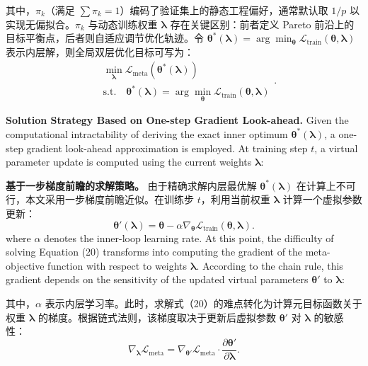\documentclass[11pt]{article}
\begin{document}
其中，$\pi_k$（满足 $\sum \pi_k = 1$）编码了验证集上的静态工程偏好，通常默认取 $1/p$ 以实现无偏拟合。$\pi_k$ 与动态训练权重 $\boldsymbol{\lambda}$ 存在关键区别：前者定义 Pareto 前沿上的目标平衡点，后者则自适应调节优化轨迹。令 $\boldsymbol{\theta}^*(\boldsymbol{\lambda}) = \arg \min_{\boldsymbol{\theta}} \mathcal{L}_{\text{train}}(\boldsymbol{\theta}, \boldsymbol{\lambda})$ 表示内层解，则全局双层优化目标可写为：
\begin{equation}
	\begin{aligned}
		& \min_{\boldsymbol{\lambda}} \mathcal{L}_{\text{meta}}(\boldsymbol{\theta}^*(\boldsymbol{\lambda})) \\
		& \text{s.t.} \quad \boldsymbol{\theta}^*(\boldsymbol{\lambda}) = \arg \min_{\boldsymbol{\theta}} \mathcal{L}_{\text{train}}(\boldsymbol{\theta}, \boldsymbol{\lambda})
	\end{aligned}.
\end{equation}

\textbf{Solution Strategy Based on One-step Gradient Look-ahead.} Given the computational intractability of deriving the exact inner optimum $\boldsymbol{\theta}^*(\boldsymbol{\lambda})$, a one-step gradient look-ahead approximation is employed. At training step $t$, a virtual parameter update is computed using the current weights $\boldsymbol{\lambda}$:

\textbf{基于一步梯度前瞻的求解策略。} 由于精确求解内层最优解 $\boldsymbol{\theta}^*(\boldsymbol{\lambda})$ 在计算上不可行，本文采用一步梯度前瞻近似。在训练步 $t$，利用当前权重 $\boldsymbol{\lambda}$ 计算一个虚拟参数更新：
\begin{equation}
	\boldsymbol{{\theta }'}(\boldsymbol{\lambda })=\boldsymbol{\theta }-\alpha {{\nabla }_{\boldsymbol{\theta }}}{{\mathcal{L}}_{\text{train}}}(\boldsymbol{\theta },\boldsymbol{\lambda }).
\end{equation}
where $\alpha$ denotes the inner-loop learning rate. At this point, the difficulty of solving Equation (20) transforms into computing the gradient of the meta-objective function with respect to weights $\boldsymbol{\lambda}$. According to the chain rule, this gradient depends on the sensitivity of the updated virtual parameters $\boldsymbol{\theta}'$ to $\boldsymbol{\lambda}$:

其中，$\alpha$ 表示内层学习率。此时，求解式（20）的难点转化为计算元目标函数关于权重 $\boldsymbol{\lambda}$ 的梯度。根据链式法则，该梯度取决于更新后虚拟参数 $\boldsymbol{\theta}'$ 对 $\boldsymbol{\lambda}$ 的敏感性：
\begin{equation}
	{{\nabla }_{\boldsymbol{\lambda }}}{{\mathcal{L}}_{\text{meta}}}={{\nabla }_{{\boldsymbol{{\theta }'}}}}{{\mathcal{L}}_{\text{meta}}}\cdot \frac{\partial \boldsymbol{{\theta }'}}{\partial \boldsymbol{\lambda }}.
\end{equation}
\end{document}
